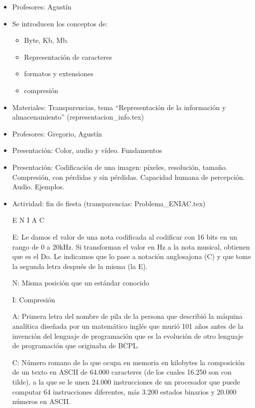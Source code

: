 \documentclass[a4paper,12pt]{article}
\begin{document}
\begin{itemize}
\item Profesores: Agustín
\item Se introducen los conceptos de:
\begin{itemize}
\item Byte, Kb, Mb.
\item Representación de caracteres
\item formatos y extensiones
\item compresión
\end{itemize}

\item Materiales: Transparencias, tema ``Representación de la información y almacenamiento''
(representacion\_info.tex)
\end{itemize}


\begin{itemize}
\item Profesores: Gregorio, Agustín
\item Presentación: Color, audio y vídeo. Fundamentos
\item Presentación: Codificación de una imagen: píxeles, resolución, tamaño. Compresión, con pérdidas y sin pérdidas. Capacidad humana de percepción. Audio. Ejemplos.

\item Actividad: fin de fiesta (transparencias: Problema\_ENIAC.tex)

E N I A C

E: Le damos el valor de una nota codificada al codificar con 16 bits en un rango de 0 a 20kHz. Si transforman el valor en Hz a la nota musical, obtienen que es el Do. Le indicamos que lo pase a notación anglosajona (C) y que tome la segunda letra después de la misma (la E).

N: Misma posición que un estándar conocido

I: Compresión

A: Primera letra del nombre de pila de la persona que describió la
máquina analítica diseñada por un matemático inglés que murió 101 años
antes de la invención del lenguaje de programación que es la evolución
de otro lenguaje de programación que originaba de BCPL.

C: Número romano de lo que ocupa en memoria en kilobytes la composición
de un texto en ASCII de 64.000 caracteres (de los cuales 16.250 son con
tilde), a la que se le unen 24.000 instrucciones de un procesador que
puede computar 64 instrucciones diferentes, más 3.200 estados binarios y
20.000 números en ASCII.

\end{itemize}
\end{document}
